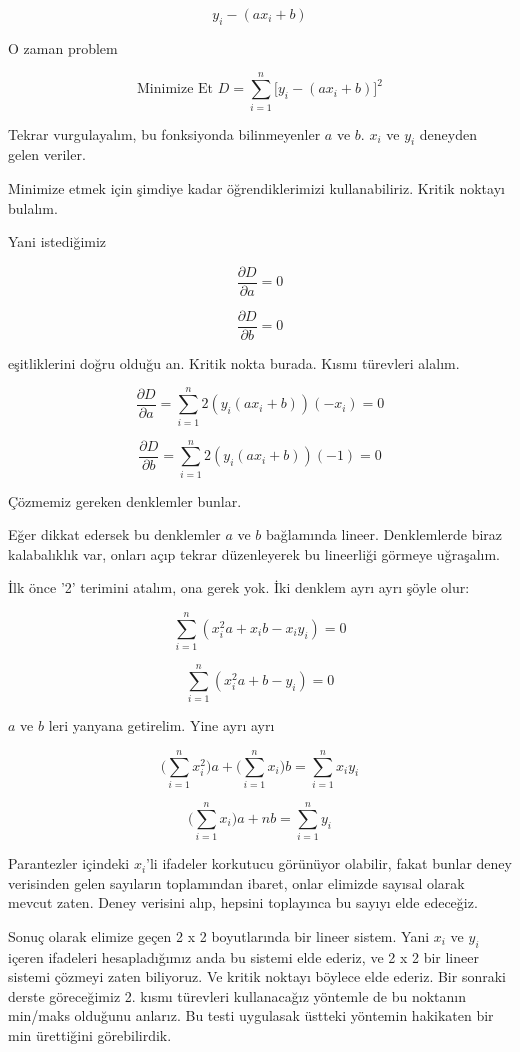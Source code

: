 \documentclass[12pt,fleqn]{article}\usepackage{../../common}
\begin{document}
$$ y_i - (ax_i + b) $$

O zaman problem

$$ \textrm{Minimize Et } D = \sum_{i=1}^n \bigg[ y_i - (ax_i+b) \bigg]^2 $$

Tekrar vurgulayalım, bu fonksiyonda bilinmeyenler $a$ ve $b$. $x_i$ ve $y_i$
deneyden gelen veriler.

Minimize etmek için şimdiye kadar öğrendiklerimizi kullanabiliriz. Kritik
noktayı bulalım.

Yani istediğimiz 

$$ \frac{\partial D}{\partial a} =0 $$

$$ \frac{\partial D}{\partial b} =0 $$

eşitliklerini doğru olduğu an. Kritik nokta burada. Kısmı türevleri alalım.

$$ \frac{\partial D}{\partial a}  =
\sum_{i=1}^n 2 (y_i (ax_i+b)) (-x_i) 
= 0
$$

$$ \frac{\partial D}{\partial b} = 
\sum_{i=1}^n 2 (y_i (ax_i+b)) (-1) 
=0
$$

Çözmemiz gereken denklemler bunlar. 

Eğer dikkat edersek bu denklemler $a$ ve $b$ bağlamında lineer. Denklemlerde
biraz kalabalıklık var, onları açıp tekrar düzenleyerek bu lineerliği görmeye
uğraşalım.

İlk önce '2' terimini atalım, ona gerek yok. İki denklem ayrı ayrı şöyle
olur:

$$ \sum_{i=1}^n (x_i^2a + x_ib - x_iy_i) = 0$$

$$ \sum_{i=1}^n (x_i^2a + b - y_i) = 0$$

$a$ ve $b$ leri yanyana getirelim. Yine ayrı ayrı

$$  \bigg(\sum_{i=1}^n x_i^2\bigg)a + \bigg(\sum_{i=1}^n x_i\bigg) b = 
\sum_{i=1}^n x_iy_i$$

$$  \bigg(\sum_{i=1}^n x_i\bigg)a + nb = \sum_{i=1}^n y_i $$

Parantezler içindeki $x_i$'li ifadeler korkutucu görünüyor olabilir, fakat
bunlar deney verisinden gelen sayıların toplamından ibaret, onlar elimizde
sayısal olarak mevcut zaten. Deney verisini alıp, hepsini toplayınca bu sayıyı
elde edeceğiz.

Sonuç olarak elimize geçen 2 x 2 boyutlarında bir lineer sistem. Yani $x_i$ ve
$y_i$ içeren ifadeleri hesapladığımız anda bu sistemi elde ederiz, ve 2 x 2 bir
lineer sistemi çözmeyi zaten biliyoruz. Ve kritik noktayı böylece elde
ederiz. Bir sonraki derste göreceğimiz 2. kısmı türevleri kullanacağız yöntemle
de bu noktanın min/maks olduğunu anlarız. Bu testi uygulasak üstteki yöntemin
hakikaten bir min ürettiğini görebilirdik.
\end{document}
